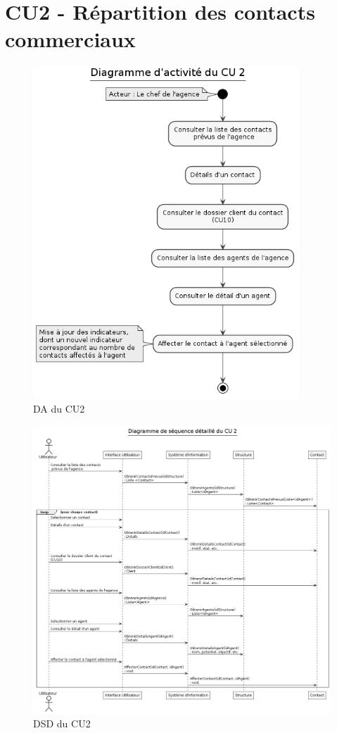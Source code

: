 \clearpage
\section{CU2 - Répartition des contacts commerciaux}

\begin{figure}[h]
\centering
\includegraphics[width=10cm]{figures/DA_CU2.png}
\caption{DA du CU2}
\end{figure}

\begin{figure}[h]
\centering
\includegraphics[width=\textwidth]{figures/DSD_CU2.png}
\caption{DSD du CU2}
\end{figure}

